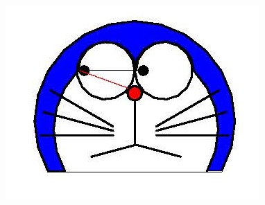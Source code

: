 \documentclass{article}
\begin{document}
    \graphicspath{{../LaTeX_Picture/Reserved file for pictures}}
    \includegraphics{doraemon2.jpg}
\end{document}
